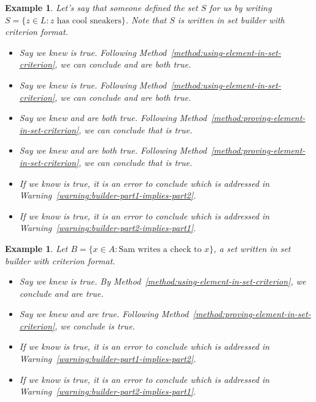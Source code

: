\documentclass{book}
\newcounter{ekcounter}%
\theoremstyle{ekimcustom}
\newtheorem{example}[ekcounter]{Example}
\begin{document}
\begin{example}
Let's say that someone defined the set $S$ for us by writing $S = \{z \in L : z \text{ has cool sneakers}\}$. Note that $S$ is written in set builder with criterion format.
\begin{itemize}
\item Say we knew  is true. Following Method~\ref{method:using-element-in-set-criterion}, we can conclude  and  are both true.
\item Say we knew  is true. Following Method~\ref{method:using-element-in-set-criterion}, we can conclude  and  are both true.
\item Say we knew  and  are both true. Following Method~\ref{method:proving-element-in-set-criterion}, we can conclude that  is true. 
\item Say we knew  and  are both true. Following Method~\ref{method:proving-element-in-set-criterion}, we can conclude that  is true. 
\item If we know  is true, it is an error to conclude  which is addressed in Warning~\ref{warning:builder-part1-implies-part2}.
\item If we know  is true, it is an error to conclude  which is addressed in Warning~\ref{warning:builder-part2-implies-part1}.
\end{itemize}
\end{example}

\begin{example}
Let $B=\{x \in A : \text{Sam writes a check to } x\}$, a set written in  set builder with criterion format.
\begin{itemize}
\item Say we knew  is true. By Method~\ref{method:using-element-in-set-criterion}, we conclude  and  are true.
\item Say we knew  and  are true. Following Method~\ref{method:proving-element-in-set-criterion}, we conclude  is true. 
\item If we know  is true, it is an error to conclude  which is addressed in Warning~\ref{warning:builder-part1-implies-part2}.
\item If we know  is true, it is an error to conclude  which is addressed in Warning~\ref{warning:builder-part2-implies-part1}.
\end{itemize}
\end{example}
\end{document}

